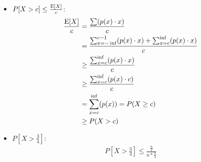 \begin{itemize}
\item{$P[X>c] \leq \frac{\mathrm{E}[X]}{c}$:
\begin{align*}
\frac{\mathrm{E}[X]}{c} &= \frac{\sum (p(x) \cdot x)}{c} \\
 &= \frac{\sum_{x = -\inf}^{c-1} (p(x) \cdot x) + \sum_{x = c}^{\inf} (p(x) \cdot x)}{c} \\
 &\ge \frac{\sum_{x = c}^{\inf} (p(x) \cdot x)}{c} \\
 &\ge \frac{\sum_{x = c}^{\inf} (p(x) \cdot c)}{c} \\
 &= \sum_{x = c}^{\inf} (p(x)) = P(X \ge c ) \\
 &\ge P(X > c )
\end{align*}}
\item{$P[X>\frac{3}{4}] $:
	\begin{align*}
	P[X>\frac{3}{4}] \le \frac{\frac{n}{2}}{n*\frac{3}{4}}
	\end{align*}
	}
\end{itemize}

